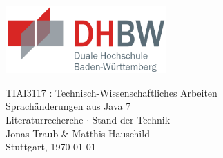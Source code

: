 \begin{titlepage}
    \begin{center}
     \includegraphics[height=2.6cm]{images/dhbw.png}

      \vspace*{12mm}    
      TIAI3117 : Technisch-Wissenschaftliches Arbeiten\\
      \vspace*{30mm}    
      {\Huge{Sprachänderungen aus Java 7}}\\
      \vspace*{30mm}    
      Literaturrecherche $\cdot$ Stand der Technik\\
      Jonas Traub \& Matthis Hauschild\\
      \vfill
      \vspace*{70mm}
      Stuttgart, \today
    \end{center}
\end{titlepage}

